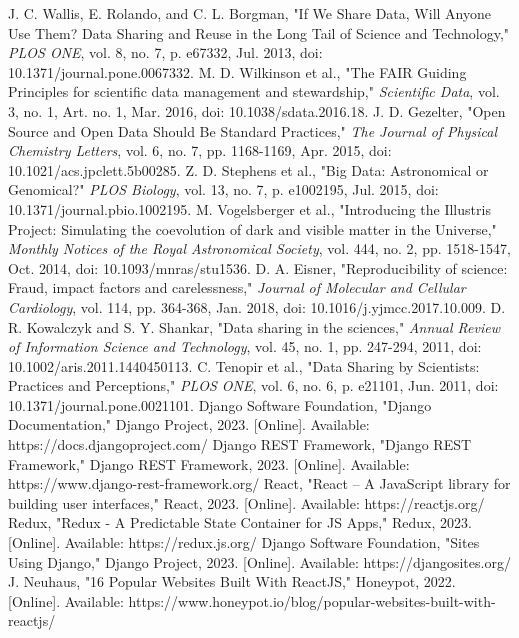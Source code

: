 \documentclass[conference]{IEEEtran}
\begin{document}
\begin{thebibliography}{00}
 J. C. Wallis, E. Rolando, and C. L. Borgman, "If We Share Data, Will Anyone Use Them? Data Sharing and Reuse in the Long Tail of Science and Technology," \textit{PLOS ONE}, vol. 8, no. 7, p. e67332, Jul. 2013, doi: 10.1371/journal.pone.0067332.
 M. D. Wilkinson et al., "The FAIR Guiding Principles for scientific data management and stewardship," \textit{Scientific Data}, vol. 3, no. 1, Art. no. 1, Mar. 2016, doi: 10.1038/sdata.2016.18.
 J. D. Gezelter, "Open Source and Open Data Should Be Standard Practices," \textit{The Journal of Physical Chemistry Letters}, vol. 6, no. 7, pp. 1168-1169, Apr. 2015, doi: 10.1021/acs.jpclett.5b00285.
 Z. D. Stephens et al., "Big Data: Astronomical or Genomical?" \textit{PLOS Biology}, vol. 13, no. 7, p. e1002195, Jul. 2015, doi: 10.1371/journal.pbio.1002195.
 M. Vogelsberger et al., "Introducing the Illustris Project: Simulating the coevolution of dark and visible matter in the Universe," \textit{Monthly Notices of the Royal Astronomical Society}, vol. 444, no. 2, pp. 1518-1547, Oct. 2014, doi: 10.1093/mnras/stu1536.
 D. A. Eisner, "Reproducibility of science: Fraud, impact factors and carelessness," \textit{Journal of Molecular and Cellular Cardiology}, vol. 114, pp. 364-368, Jan. 2018, doi: 10.1016/j.yjmcc.2017.10.009.
 D. R. Kowalczyk and S. Y. Shankar, "Data sharing in the sciences," \textit{Annual Review of Information Science and Technology}, vol. 45, no. 1, pp. 247-294, 2011, doi: 10.1002/aris.2011.1440450113.
 C. Tenopir et al., "Data Sharing by Scientists: Practices and Perceptions," \textit{PLOS ONE}, vol. 6, no. 6, p. e21101, Jun. 2011, doi: 10.1371/journal.pone.0021101.
 Django Software Foundation, "Django Documentation," Django Project, 2023. [Online]. Available: https://docs.djangoproject.com/
 Django REST Framework, "Django REST Framework," Django REST Framework, 2023. [Online]. Available: https://www.django-rest-framework.org/
 React, "React – A JavaScript library for building user interfaces," React, 2023. [Online]. Available: https://reactjs.org/
 Redux, "Redux - A Predictable State Container for JS Apps," Redux, 2023. [Online]. Available: https://redux.js.org/
 Django Software Foundation, "Sites Using Django," Django Project, 2023. [Online]. Available: https://djangosites.org/
 J. Neuhaus, "16 Popular Websites Built With ReactJS," Honeypot, 2022. [Online]. Available: https://www.honeypot.io/blog/popular-websites-built-with-reactjs/

\end{thebibliography}
\end{document}
